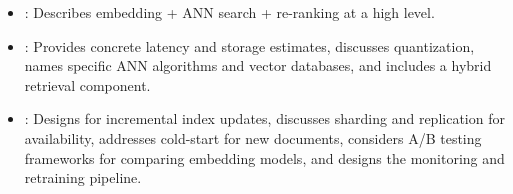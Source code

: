 \begin{interviewq}

\goodgreat
\begin{itemize}
    \item {}: Describes embedding + ANN search + re-ranking at
    a high level.
    \item {}: Provides concrete latency and storage estimates,
    discusses quantization, names specific ANN algorithms and vector
    databases, and includes a hybrid retrieval component.
    \item {}: Designs for incremental index updates, discusses
    sharding and replication for availability, addresses cold-start for new
    documents, considers A/B testing frameworks for comparing embedding
    models, and designs the monitoring and retraining pipeline.
\end{itemize}

\end{interviewq}
